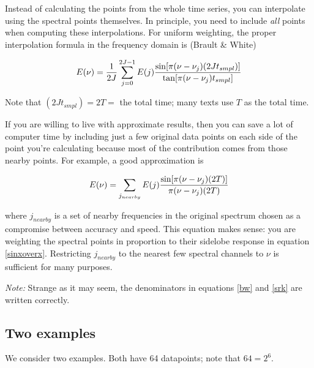 \documentclass[psfig,preprint]{aastex}
\begin{document}
	Instead of calculating the points from the whole time series,
you can interpolate using the spectral points themselves. In principle,
you need to include {\it all} points when computing these
interpolations.  For uniform weighting, the proper interpolation formula
in the frequency domain is (Brault \& White)

\begin{equation} \label{bw}
E(\nu) = {1 \over 2J} \sum_{j=0}^{2J-1} E(j) 
  { \sin[ \pi (\nu - \nu_j) (2Jt_{smpl})] \over
    \tan[ \pi (\nu - \nu_j) t_{smpl} ] }
\end{equation}

\noindent Note that $(2Jt_{smpl}) = 2T =$ the total time; many texts use
$T$ as the total time.

	If you are willing to live with approximate results, then you
can save a lot of computer time by including just a few original data
points on each side of the point you're calculating because most of the
contribution comes from those nearby points. For example, a good
approximation is 

\begin{equation} \label{srk}
E(\nu) = \sum_{j_{nearby}} E(j) 
  { \sin[ \pi (\nu - \nu_j) (2T) ] \over
     \pi (\nu - \nu_j) (2T)  }
\end{equation}

\noindent where $j_{nearby}$ is a set of nearby frequencies in the
original spectrum chosen as a compromise between accuracy and speed.
This equation makes sense: you are weighting the spectral points in
proportion to their sidelobe response in equation \ref{sinxoverx}. 
Restricting $j_{nearby}$ to the nearest few spectral channels to $\nu$
is sufficient for many purposes. 

	{\it Note:} Strange as it may seem, the denominators in
equations \ref{bw} and \ref{srk} are written correctly.

\subsection{Two examples}

	We consider two examples. Both have 64 datapoints; note that $64
= 2^6$.
\end{document}
